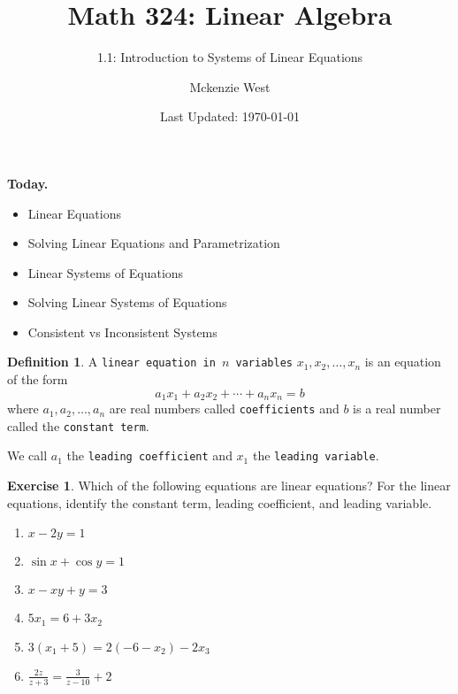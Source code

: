 \documentclass{beamer}
\theoremstyle{definition}
\newtheorem{exercise}{Exercise}
\newtheorem*{defn}{Definition}
\renewcommand{\emph}[1]{{\color{blue}\texttt{#1}}}
\begin{document}
	\title{Math 324: Linear Algebra}
	\subtitle{1.1: Introduction to Systems of Linear Equations}
	\author{Mckenzie West}
	\date{Last Updated: \today}
\begin{frame}
\maketitle
\end{frame}
\begin{frame}{\insertframenumber}
	\begin{block}{\textbf{Today.}}
		\begin{itemize}[label=--]
			\item Linear Equations
			\item Solving Linear Equations and Parametrization
			\item Linear Systems of Equations
			\item Solving Linear Systems of Equations
			\item Consistent vs Inconsistent Systems
		\end{itemize}
	\end{block}
\end{frame}

\begin{frame}{\insertframenumber}
\begin{defn}
	A \emph{linear equation in $n$ variables} $x_1,x_2,\dots,x_n$ is an equation of the form
	\[a_1x_1+a_2x_2+\cdots+a_nx_n=b\]
where $a_1,a_2,\dots,a_n$ are real numbers called \emph{coefficients} and $b$ is a real number called the \emph{constant term}.\par
We call $a_1$ the \emph{leading coefficient} and $x_1$ the \emph{leading variable}.
\end{defn}
\end{frame}

\begin{frame}{\insertframenumber}
\begin{exercise}
	Which of the following equations are linear equations?  For the linear equations, identify the constant term, leading coefficient, and leading variable.
	\begin{multicols}{2}
	\begin{enumerate}[label=(\alph*)]
		\item $x-2y=1$
		\item $\sin x+\cos y=1$
		\item $x-xy+y=3$
		\item $5x_1=6+3x_2$
		\item $3(x_1+5)=2(-6-x_2)-2x_3$
		\item $\displaystyle\frac{2z}{z+3}=\frac{3}{z-10}+2$
	\end{enumerate}
	\end{multicols}
\end{exercise}
\end{frame}
\end{document}
